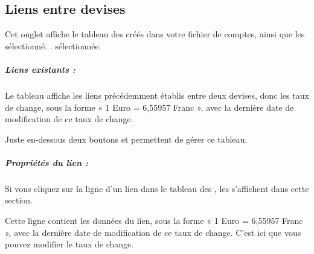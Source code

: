 \subsection{Liens entre devises\label{setup-resources-rate}}

Cet onglet affiche le tableau des  créés dans votre fichier de comptes, ainsi que les  \ifIllustration sélectionné. . 
\else sélectionnée.
\fi






\subparagraph{Liens existants :\label{setup-resources-rate-existing}}

Le tableau affiche les liens précédemment établis entre deux devises, donc les taux de change, sous la forme « 1 Euro = 6,55957 Franc », avec la dernière date de modification de ce taux de change.

Juste en-dessous deux boutons  et  permettent de gérer ce tableau.






\subparagraph{Propriétés du lien :\label{setup-resources-rate-properties}}

Si vous cliquez sur la ligne d'un lien dans le tableau des , les  s'affichent dans cette section.

Cette ligne contient les données du lien, sous la forme « 1 Euro = 6,55957 Franc », avec la dernière date de modification de ce taux de change. C'est ici que vous pouvez modifier le taux de change.



